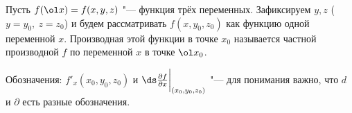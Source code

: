 
	 	Пусть $f(\ol x) = f(x,y,z)$ "--- функция трёх переменных. Зафиксируем $y,z$ ($y = y_0,\ z= z_0$) и будем рассматривать $f(x,y_0,z_0)$
	 	как функцию одной переменной $x$. Производная этой функции в точке $x_0$ называется частной производной $f$ по переменной $x$ в точке $\ol x_0$.
	 	
	 	Обозначения: $f'_x(x_0,y_0,z_0)$ и $\ds\frac{\partial f}{\partial x}\bigg|_{(x_0,y_0,z_0)}$ "--- для понимания важно, что $d$ и $\partial $ есть разные обозначения.
	 